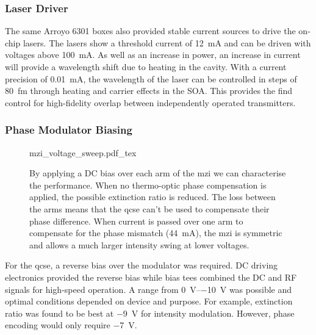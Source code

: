 \subsubsection*{Laser Driver}

The same Arroyo 6301 boxes also provided stable current sources to drive the on-chip lasers. The lasers show a threshold current of \SI{12}{mA} and can be driven with voltages above \SI{100}{mA}. As well as an increase in power, an increase in current will provide a wavelength shift due to heating in the cavity. With a current precision of \SI{0.01}{mA}, the wavelength of the laser can be controlled in steps of \SI{80}{fm} through heating and carrier effects in the \ac{SOA}. This provides the find control for high-fidelity overlap between independently operated transmitters. 

\subsubsection*{Phase Modulator Biasing}

\begin{figure}[t]
	\centering
	\def\svgwidth{\textwidth} 
	{mzi_voltage_sweep.pdf_tex}
	\caption[MZI calibration through thermo-optic modulation]{By applying a DC bias over each arm of the \ac{mzi} we can characterise the performance. When no thermo-optic phase compensation is applied, the possible extinction ratio is reduced. The loss between the arms means that the \ac{qcse} can't be used to compensate their phase difference. When current is passed over one arm to compensate for the phase mismatch (\SI{44}{\mA}), the \ac{mzi} is symmetric and allows a much larger intensity swing at lower voltages.}
	\label{fig:mzi_cal}
\end{figure}

For the \ac{qcse}, a reverse bias over the modulator was required. DC driving electronics provided the reverse bias while bias tees combined the DC and RF signals for high-speed operation. A range from \SIrange{0}{-10}{\V} was possible and optimal conditions depended on device and purpose. For example, extinction ratio was found to be best at \SI{-9}{\V} for intensity modulation. However, phase encoding would only require \SI{-7}{\V}.



